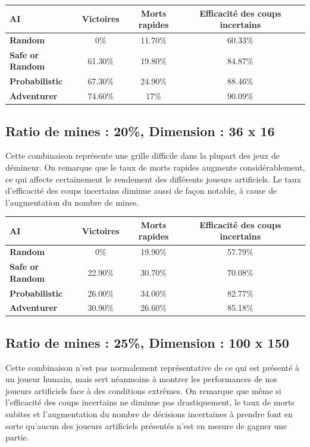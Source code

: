 \documentclass{article}
\begin{document}
\begin{tabular}{| l | c | c | c | c | }
        \hline
	\textbf{AI} & \textbf{Victoires} & \textbf{Morts rapides} & \textbf{Efficacité des coups incertains} \\
        \hline
	\textbf{Random} & 0\% & 11.70\% & 60.33\% \\
        \hline
	\textbf{Safe or Random} & 61.30\% & 19.80\% & 84.87\% \\
        \hline
	\textbf{Probabilistic} & 67.30\% & 24.90\% & 88.46\% \\
        \hline
	\textbf{Adventurer} & 74.60\% & 17\% & 90.09\% \\
        \hline
\end{tabular}

\subsection{Ratio de mines : 20\%, Dimension : 36 x 16}

Cette combinaison représente une grille difficile dans la plupart des jeux de démineur. On remarque que le taux de morts rapides augmente
considérablement, ce qui affecte certainement le rendement des différents joueurs artificiels. Le taux d'efficacité des coups incertains diminue 
aussi de façon notable, à cause de l'augmentation du nombre de mines.

\begin{tabular}{| l | c | c | c | c | }
        \hline
	\textbf{AI} & \textbf{Victoires} & \textbf{Morts rapides} & \textbf{Efficacité des coups incertains} \\
        \hline
	\textbf{Random} & 0\% & 19.90\% & 57.79\% \\
        \hline
	\textbf{Safe or Random} & 22.90\% & 30.70\% & 70.08\% \\
        \hline
	\textbf{Probabilistic} & 26.00\% & 34.00\% & 82.77\% \\
        \hline
	\textbf{Adventurer} & 30.90\% & 26.60\% & 85.18\% \\
        \hline
\end{tabular}

\subsection{Ratio de mines : 25\%, Dimension : 100 x 150}

Cette combinaison n'est pas normalement représentative de ce qui est présenté à un joueur humain, mais sert néanmoins à montrer
les performances de nos joueurs artificiels face à des conditions extrêmes. On remarque que même si l'efficacité des coups
incertains ne diminue pas drastiquement, le taux de morts subites et l'augmentation du nombre de décisions incertaines à prendre
font en sorte qu'aucun des joueurs artificiels présentés n'est en mesure de gagner une partie.
\end{document}
